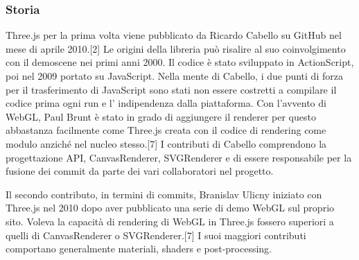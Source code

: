 
\subsubsection{Storia}
Three.js per la prima volta viene pubblicato da Ricardo Cabello su GitHub nel mese di aprile 2010.[2]
Le origini della libreria pu\`o risalire al suo coinvolgimento con il demoscene nei primi anni 2000.
Il codice \`e stato sviluppato in ActionScript, poi nel 2009 portato su JavaScript. Nella mente di Cabello,
i due punti di forza per il trasferimento di JavaScript sono stati non essere costretti a compilare il codice prima
ogni run e l' indipendenza dalla piattaforma. Con l'avvento di WebGL, Paul Brunt è stato in grado di aggiungere il renderer
per questo abbastanza facilmente come Three.js creata con il codice di rendering come modulo anziché nel
nucleo stesso.[7] I contributi di Cabello comprendono la progettazione API, CanvasRenderer, SVGRenderer e di essere
responsabile per la fusione dei commit da parte dei vari collaboratori nel progetto.


Il secondo contributo, in termini di commits, Branislav Ulicny iniziato con Three.js nel 2010 dopo aver
pubblicato una serie di demo WebGL sul proprio sito. Voleva la capacit\`a di rendering di WebGL in Three.js
fossero superiori a quelli di CanvasRenderer o SVGRenderer.[7]
I suoi maggiori contributi comportano generalmente materiali, shaders e post-processing.

